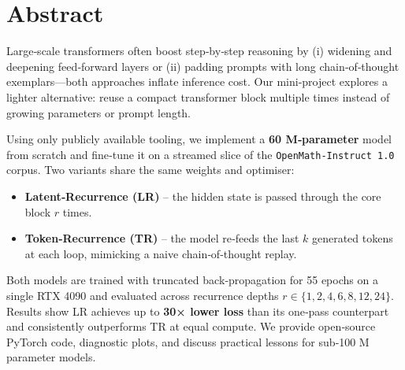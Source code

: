 \chapter*{\centering Abstract}

Large‑scale transformers often boost step‑by‑step reasoning by (i) widening
and deepening feed‑forward layers or (ii) padding prompts with long
chain‑of‑thought exemplars—both approaches inflate inference cost.  
Our mini‑project explores a lighter alternative: reuse a compact transformer
block multiple times instead of growing parameters or prompt length.

Using only publicly available tooling, we implement a
\textbf{60 M‑parameter} model from scratch and fine‑tune it on a streamed
slice of the \texttt{OpenMath‑Instruct 1.0} corpus.
Two variants share the same weights and optimiser:

\begin{itemize}
    \item \textbf{Latent‑Recurrence (LR)} – the hidden state is passed
          through the core block $r$ times.
    \item \textbf{Token‑Recurrence (TR)} – the model re‑feeds the last $k$
          generated tokens at each loop, mimicking a naive
          chain‑of‑thought replay.
\end{itemize}

Both models are trained with truncated back‑propagation for 55 epochs on a
single RTX 4090 and evaluated across recurrence depths
$r\!\in\!\{1,2,4,6,8,12,24\}$.  
Results show LR achieves up to \textbf{30× lower loss} than its one‑pass
counterpart and consistently outperforms TR at equal compute.  
We provide open‑source PyTorch code, diagnostic plots, and discuss practical
lessons for sub‑100 M parameter models.
